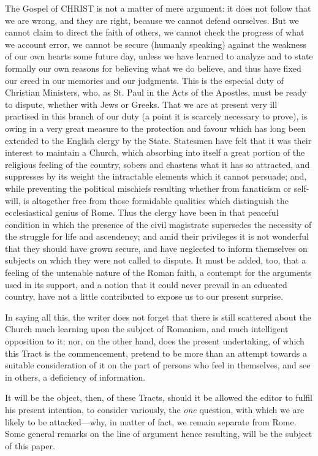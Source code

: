 The Gospel of CHRIST
is not a matter of mere argument: it does not follow that we are
wrong, and they are right, because we cannot defend ourselves. But we
cannot claim to direct the faith of others, we cannot check the
progress of what we account error, we cannot be secure (humanly
speaking) against the weakness of our own hearts some future day,
unless we have learned to analyze and to state formally our own
reasons for believing what we do believe, and thus have fixed our
creed in our memories and our judgments. This is the especial duty of
Christian Ministers, who, as St. Paul in the Acts of the Apostles,
must be ready to dispute, whether with Jews or Greeks. That we are at
present very ill practised in this branch of our duty (a point it
is scarcely necessary to prove), is owing in a very great measure to
the protection and favour which has long been extended to the English
clergy by the State. Statesmen have felt that it was their interest to
maintain a Church, which absorbing into itself a great portion of the
religious feeling of the country, sobers and chastens what it has so
attracted, and suppresses by its weight the intractable elements which
it cannot persuade; and, while preventing the political mischiefs
resulting whether from fanaticism or self-will, is altogether free
from those formidable qualities which distinguish the ecclesiastical
genius of Rome. Thus the clergy have been in that peaceful condition
in which the presence of the civil magistrate supersedes the necessity
of the struggle for life and ascendency; and amid their privileges it
is not wonderful that they should have grown secure, and have
neglected to inform themselves on subjects on which they were not
called to dispute. It must be added, too, that a feeling of the
untenable nature of the Roman faith, a contempt for the arguments used
in its support, and a notion that it could never prevail in an
educated country, have not a little contributed to expose us to our
present surprise.

In saying all this, the writer does not forget
that there is still scattered about the Church much learning upon the
subject of Romanism, and much intelligent opposition to it; nor, on
the other hand, does the present undertaking, of which this Tract is
the commencement, pretend to be more than an attempt towards a
suitable consideration of it on the part of persons who feel in
themselves, and see in others, a deficiency of information.

It will be the object, then, of these Tracts,
should it be allowed the editor to fulfil his present intention, to
consider variously, the \emph{one} question, with which we are likely
to be attacked—why, in matter of fact, we remain separate from Rome.
Some general remarks on the line of argument hence resulting,
will be the subject of this paper.

